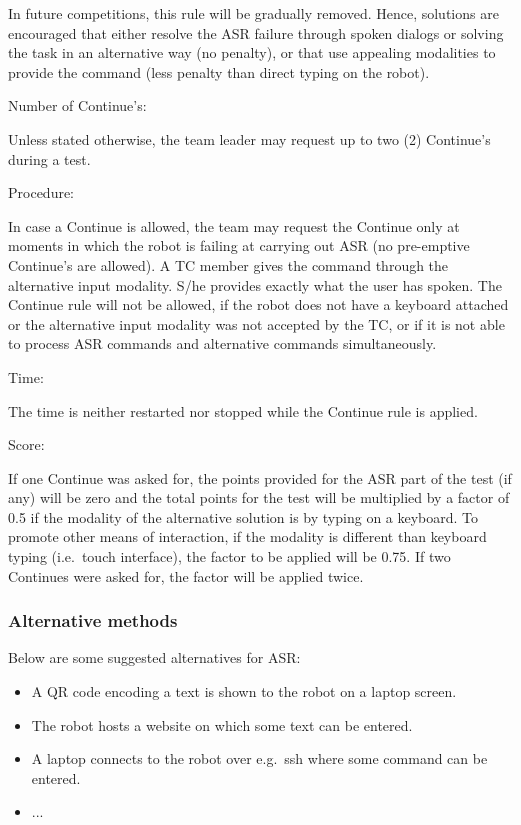 In future competitions, this rule will be gradually removed. Hence, solutions are encouraged that either resolve the ASR failure through spoken dialogs or solving the task in an alternative way (no penalty), or that use appealing modalities to provide the command (less penalty than direct typing on the robot).

\begin{enumerate}
	{\bf\item Number of Continue's:} Unless stated otherwise, the team leader may request up to two (2) Continue's during a test. 
	{\bf\item Procedure:} In case a Continue is allowed, the team may request the Continue only at moments in which the robot is failing at carrying out ASR (no pre-emptive Continue's are allowed). A TC member gives the command through the alternative input modality. S/he provides exactly what the user has spoken. The Continue rule will not be allowed, if the robot does not have a keyboard attached or the alternative input modality was not accepted by the TC, or if it is not able to process ASR commands and alternative commands simultaneously.
	{\bf\item Time:} The time is neither restarted nor stopped while the Continue rule is applied.
	{\bf\item Score:} If one Continue was asked for, the points provided for the ASR part of the test (if any) will be zero and the total points for the test will be multiplied by a factor of 0.5 if the modality of the alternative solution is by typing on a keyboard. To promote other means of interaction, if the modality is different than keyboard typing (i.e.~touch interface), the factor to be applied will be 0.75. If two Continues were asked for, the factor will be applied twice.
\end{enumerate}

\subsubsection{Alternative methods}
Below are some suggested alternatives for ASR:
\begin{itemize}
	 \item A QR code encoding a text is shown to the robot on a laptop screen.
	 \item The robot hosts a website on which some text can be entered.
	 \item A laptop connects to the robot over e.g.~ssh where some command can be entered. 
 \item ...
\end{itemize}



